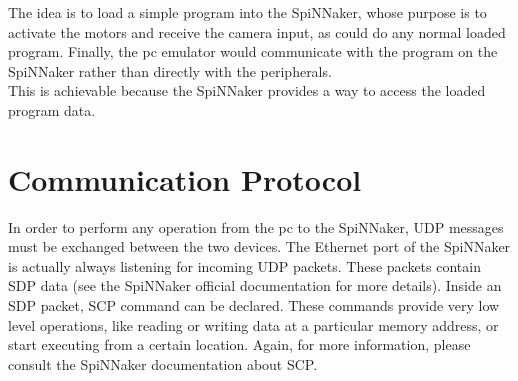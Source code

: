 \documentclass{article}
\begin{document}
The idea is to load a simple program into the SpiNNaker, whose purpose is to activate the motors and receive the camera input, as could do any normal loaded program. Finally, the pc emulator would communicate with the program on the SpiNNaker rather than directly with the peripherals. \\
This is achievable because the SpiNNaker provides a way to access the loaded program data.

\section{Communication Protocol}
In order to perform any operation from the pc to the SpiNNaker, UDP messages must be exchanged between the two devices. The Ethernet port of the SpiNNaker is actually always listening for incoming UDP packets. These packets contain SDP data (see the SpiNNaker official documentation for more details). Inside an SDP packet, SCP command can be declared. These commands provide very low level operations, like reading or writing data at a particular memory address, or start executing from a certain location. Again, for more information, please consult the SpiNNaker documentation about SCP.
\end{document}
